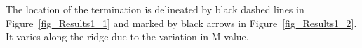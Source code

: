 The location of the termination is delineated by black dashed lines in Figure~\hyperref[fig_Results1_1]{\ref{fig_Results1_1}} and marked by black arrows in Figure~\hyperref[fig_Results1_2]{\ref{fig_Results1_2}}. It varies along the ridge due to the variation in M value.

